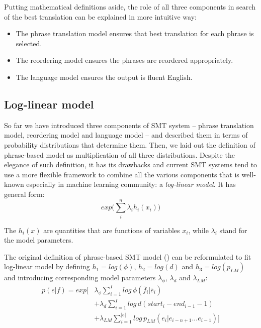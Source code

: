 Putting mathematical definitions aside, the role of all three components in search of
the best translation can be explained in more intuitive way:
\begin{itemize}
  \item The phrase translation model ensures that best translation for each phrase is selected.
  \item The reordering model ensures the phrases are reordered appropriately.
  \item The language model ensures the output is fluent English.
\end{itemize}

\subsection{Log-linear model}

So far we have introduced three components of SMT system -- phrase translation model,
reordering model and language model -- and described them in terms of probability
distributions that determine them.
Then, we laid out the definition of phrase-based model as multiplication of all
three distributions.
Despite the elegance of such definition, it has its drawbacks and current SMT
systems tend to use a more flexible framework to combine all the various
components that is well-known especially in machine learning community:
a \emph{log-linear model}.
It has general form:
\begin{equation}
  exp \Big( \sum_i^n \lambda_i h_i(x_i) \Big)
\end{equation}

The $h_i(x)$ are quantities that are functions of variables $x_i$,
while $\lambda_i$ stand for the model parameters.

The original definition of phrase-based SMT model () can be reformulated to
fit log-linear model by defining $h_1 = log(\phi)$, $h_2 = log(d)$ and $h_3 = log(p_{LM})$
and introducing corresponding model parameters $\lambda_{\phi}$, $\lambda_{d}$ and $\lambda_{LM}$:
\begin{equation}
  \begin{aligned}
  p(e|f) = exp \Bigg[ &\lambda_{\phi} \sum_{i=1}^I log \, \phi(\bar{f}_i|\bar{e}_i) \\
       &+ \lambda_{d} \sum_{i=1}^{I} log \, d(start_i - end_{i-1} - 1) \\
       &+ \lambda_{LM} \sum_{i=1}^{|e|} log \, p_{LM}(e_i|e_{i-n+1}...e_{i-1}) \Bigg] \\
  \end{aligned}
\end{equation}

